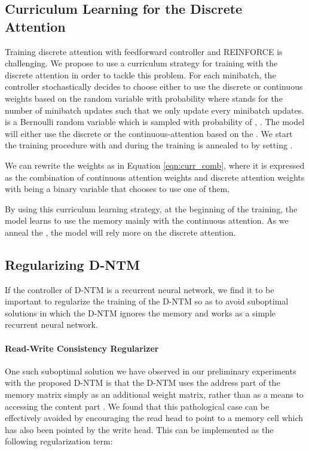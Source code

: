 \documentclass[12pt]{article}
\begin{document}
\subsection{Curriculum Learning for the Discrete Attention}
\label{sec:curr_disc_att}
Training discrete attention with feedforward controller and REINFORCE is challenging. We propose to use a curriculum strategy for training with the discrete attention in order to tackle this problem. For each minibatch, the controller stochastically decides to choose either to use the discrete or continuous weights based on the random variable  with probability  where  stands for the number of  minibatch updates such that we only update  every  minibatch updates.  is a Bernoulli random variable which is sampled with probability of , . The model will either use the discrete or the continuous-attention based on the . We start the training procedure with  and during the training  is annealed to  by setting .

We can rewrite the weights  as in Equation \eqref{eqn:curr_comb}, where it is expressed as the combination of continuous attention weights  and discrete attention weights  with  being a binary variable that chooses to use one of them,



By using this curriculum learning strategy, at the beginning of the training, the model learns to use the memory mainly with the continuous attention. As we anneal the , the model will rely more on the discrete attention.


\subsection{Regularizing D-NTM}
\label{sec:reg_dntm}

If the controller of D-NTM is a recurrent neural network, we find it to be
important to regularize the training of the D-NTM so as to avoid suboptimal
solutions in which the D-NTM ignores the memory and works as a simple recurrent
neural network. 

\paragraph{Read-Write Consistency Regularizer}


One such suboptimal solution we have observed in our preliminary experiments
with the proposed D-NTM is that the D-NTM uses the address part  of the
memory matrix simply as an additional weight matrix, rather than as a means to
accessing the content part . We found that this pathological case can be
effectively avoided by encouraging the read head to point to a memory cell which
has also been pointed by the write head. This can be implemented as the
following regularization term:
\end{document}
